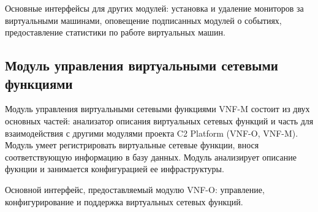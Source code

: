 \documentclass[oneside,final,14pt,a4paper]{extreport}
\begin{document}
Основные интерфейсы для других модулей: установка и удаление мониторов за виртуальными машинами, оповещение подписанных модулей о событиях, предоставление статистики по работе виртуальных машин.

\subsection{Модуль управления виртуальными сетевыми функциями}
Модуль управления виртуальными сетевыми функциями VNF-M состоит из двух основных частей: анализатор описания виртуальных сетевых функций и часть для взаимодействия с другими модулями проекта C2 Platform (VNF-O, VNF-M). Модуль умеет регистрировать виртуальные сетевые функции, внося соответствующую информацию в базу данных. Модуль анализирует описание фукнции и занимается конфигурацией ее инфраструктуры.

Основной интерфейс, предоставляемый модулю VNF-O: управление, конфигурирование и поддержка виртуальных сетевых функций.
\end{document}
